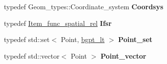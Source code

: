 \begin{DoxyCompactItemize}
typedef Geom\+\_\+types\+::\+Coordinate\+\_\+system {\bfseries Coordsys}
\item 
\mbox{\label{classBG__wrap_aee15b3b5a5f6ea79795624982ccb892f}} 
typedef \mbox{\hyperlink{classItem__func__spatial__rel}{Item\+\_\+func\+\_\+spatial\+\_\+rel}} {\bfseries Ifsr}
\item 
\mbox{\label{classBG__wrap_a6af45e09a93900096ae1edd92163c883}} 
typedef std\+::set$<$ Point, \mbox{\hyperlink{structbgpt__lt}{bgpt\+\_\+lt}} $>$ {\bfseries Point\+\_\+set}
\item 
\mbox{\label{classBG__wrap_a55ed7f297d0352d38e51a85892fa2fae}} 
typedef std\+::vector$<$ Point $>$ {\bfseries Point\+\_\+vector}
\end{DoxyCompactItemize}
